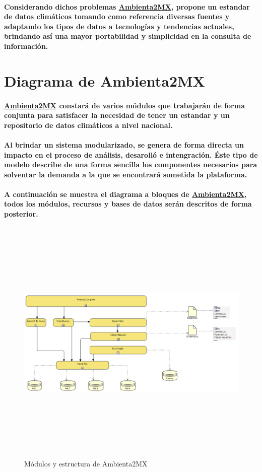     \paragraph{Considerando dichos problemas \underline{Ambienta2MX}, propone un estandar de datos climáticos tomando como referencia diversas fuentes y adaptando los tipos de datos a tecnologías y tendencias actuales, brindando así una mayor portabilidad y simplicidad en la consulta de información.}
  \newpage
  \section{Diagrama de Ambienta2MX}
    \paragraph{\underline{Ambienta2MX} constará de varios módulos que trabajarán de forma conjunta para satisfacer la necesidad de tener un estandar y un repositorio de datos climáticos a nivel nacional.}
    \paragraph{Al brindar un sistema modularizado, se genera de forma directa un impacto en el proceso de análisis, desarolló e intengración. Éste tipo de modelo describe de una forma sencilla los componentes necesarios para solventar la demanda a la que se encontrará sometida la plataforma.}
    \paragraph{A continuación se muestra el diagrama a bloques de \underline{Ambienta2MX}, todos los módulos, recursos y bases de datos serán descritos de forma posterior.}
  \newpage
    \begin{landscape}
      \begin{figure}[h!]
      \centering
      \includegraphics[width=22.5cm,height=12cm]{./images/DiagramaAmbienta2MX.png}
      \caption{Módulos y estructura de Ambienta2MX}
    \end{figure}
    \end{landscape}
  \newpage
